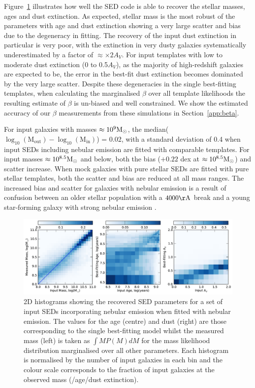 Figure~\ref{smf-fig:masscomparison} illustrates how well the SED code is able to recover the stellar masses, ages and dust extinction. As expected, stellar mass is the most robust of the parameters with age and dust extinction showing a very large scatter and bias due to the degeneracy in fitting. The recovery of the input dust extinction in particular is very poor, with the extinction in very dusty galaxies systematically underestimated by a factor of $\approx \times 2 A_{V}$. For input templates with low to moderate dust extinction (0 to 0.5$A_{V}$), as the majority of high-redshift galaxies are expected to be, the error in the best-fit dust extinction becomes dominated by the very large scatter. Despite these degeneracies in the single best-fitting templates, when calculating the marginalised $\beta$ over all template likelihoods the resulting estimate of $\beta$ is un-biased and well constrained. We show the estimated accuracy of our $\beta$ measurements from these simulations in Section~\ref{app:beta}.

For input galaxies with masses $\approx 10^9 \rm{M}_{\odot}$, the median($\log_{10}(\text{M}_{\text{out}}) - \log_{10}(\text{M}_{\text{in}})$) = 0.02, with a standard deviation of 0.4 when input SEDs including nebular emission are fitted with comparable templates. For input masses $\approx 10^{8.5} \rm{M}_{\odot}$ and below, both the bias ($+0.22$ dex at $\approx 10^{8.5} \rm{M}_{\odot}$) and scatter increase.
When mock galaxies with pure stellar SEDs are fitted with pure stellar templates, both the scatter and bias are reduced at all mass ranges. The increased bias and scatter for galaxies with nebular emission is a result of confusion between an older stellar population with a $4000\rm{\AA}$ break and a young star-forming galaxy with strong nebular emission \citep{2009A&A...502..423S,2013MNRAS.429..302C}. 

\begin{figure}
\includegraphics[width=\textwidth]{plots/fig5.pdf}
\caption[2D histograms showing the recovered SED parameters for a set of input SEDs incorporating nebular emission when fitted with nebular emission.]{2D histograms showing the recovered SED parameters for a set of input SEDs incorporating nebular emission when fitted with nebular emission. The values for the age (centre) and dust (right) are those corresponding to the single best-fitting model whilst the measured mass (left) is taken as $\int M P(M)dM$ for the mass likelihood distribution  marginalised over all other parameters. Each histogram is normalised by the number of input galaxies in each bin and the colour scale corresponds to the fraction of input galaxies at the observed mass (/age/dust extinction).}
\label{smf-fig:masscomparison}
\end{figure}

